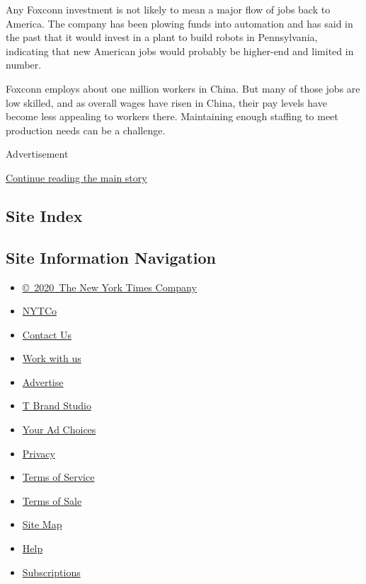 Any Foxconn investment is not likely to mean a major flow of jobs back
to America. The company has been plowing funds into automation and has
said in the past that it would invest in a plant to build robots in
Pennsylvania, indicating that new American jobs would probably be
higher-end and limited in number.

Foxconn employs about one million workers in China. But many of those
jobs are low skilled, and as overall wages have risen in China, their
pay levels have become less appealing to workers there. Maintaining
enough staffing to meet production needs can be a challenge.

Advertisement

\protect\hyperlink{after-bottom}{Continue reading the main story}

\hypertarget{site-index}{%
\subsection{Site Index}\label{site-index}}

\hypertarget{site-information-navigation}{%
\subsection{Site Information
Navigation}\label{site-information-navigation}}

\begin{itemize}
\tightlist
\item
  \href{https://help.nytimes.com/hc/en-us/articles/115014792127-Copyright-notice}{©~2020~The
  New York Times Company}
\end{itemize}

\begin{itemize}
\tightlist
\item
  \href{https://www.nytco.com/}{NYTCo}
\item
  \href{https://help.nytimes.com/hc/en-us/articles/115015385887-Contact-Us}{Contact
  Us}
\item
  \href{https://www.nytco.com/careers/}{Work with us}
\item
  \href{https://nytmediakit.com/}{Advertise}
\item
  \href{http://www.tbrandstudio.com/}{T Brand Studio}
\item
  \href{https://www.nytimes.com/privacy/cookie-policy\#how-do-i-manage-trackers}{Your
  Ad Choices}
\item
  \href{https://www.nytimes.com/privacy}{Privacy}
\item
  \href{https://help.nytimes.com/hc/en-us/articles/115014893428-Terms-of-service}{Terms
  of Service}
\item
  \href{https://help.nytimes.com/hc/en-us/articles/115014893968-Terms-of-sale}{Terms
  of Sale}
\item
  \href{https://spiderbites.nytimes.com}{Site Map}
\item
  \href{https://help.nytimes.com/hc/en-us}{Help}
\item
  \href{https://www.nytimes.com/subscription?campaignId=37WXW}{Subscriptions}
\end{itemize}

